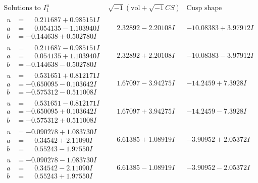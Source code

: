 \documentclass[1p]{elsarticle_modified}
\theoremstyle{definition}
\newcommand{\I}{\sqrt{-1}}
\begin{document}
$$\begin{array}{c|c|c}  
\text{Solutions to }I^u_{1}& \I (\text{vol} + \sqrt{-1}CS) & \text{Cusp shape}\\
 \hline 
\begin{aligned}
u &= \phantom{-}0.211687 + 0.985151 I \\
a &= \phantom{-}0.054135 - 1.103940 I \\
b &= -0.144638 + 0.502780 I\end{aligned}
 & \phantom{-}2.32892 - 2.20108 I & -10.08383 + 3.97912 I \\ \hline\begin{aligned}
u &= \phantom{-}0.211687 - 0.985151 I \\
a &= \phantom{-}0.054135 + 1.103940 I \\
b &= -0.144638 - 0.502780 I\end{aligned}
 & \phantom{-}2.32892 + 2.20108 I & -10.08383 - 3.97912 I \\ \hline\begin{aligned}
u &= \phantom{-}0.531651 + 0.812171 I \\
a &= -0.650095 - 0.103642 I \\
b &= -0.575312 - 0.511008 I\end{aligned}
 & \phantom{-}1.67097 - 3.94275 I & -14.2459 + 7.3928 I \\ \hline\begin{aligned}
u &= \phantom{-}0.531651 - 0.812171 I \\
a &= -0.650095 + 0.103642 I \\
b &= -0.575312 + 0.511008 I\end{aligned}
 & \phantom{-}1.67097 + 3.94275 I & -14.2459 - 7.3928 I \\ \hline\begin{aligned}
u &= -0.090278 + 1.083730 I \\
a &= \phantom{-}0.34542 + 2.11090 I \\
b &= \phantom{-}0.55243 - 1.97550 I\end{aligned}
 & \phantom{-}6.61385 + 1.08919 I & -3.90952 + 2.05372 I \\ \hline\begin{aligned}
u &= -0.090278 - 1.083730 I \\
a &= \phantom{-}0.34542 - 2.11090 I \\
b &= \phantom{-}0.55243 + 1.97550 I\end{aligned}
 & \phantom{-}6.61385 - 1.08919 I & -3.90952 - 2.05372 I \\ \hline\begin{aligned}

\end{aligned}
\end{array}$$
\end{document}
